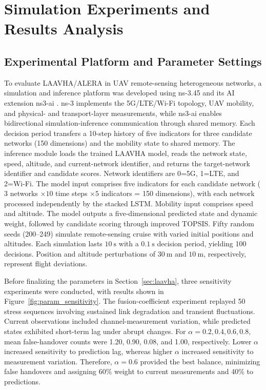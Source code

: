 \documentclass[remotesensing,article,submit,moreauthors]{Definitions/mdpi}
\begin{document}
\section{Simulation Experiments and Results Analysis}\label{sec:sim}

\subsection{Experimental Platform and Parameter Settings}\label{sec:platform}

To evaluate LAAVHA/ALERA in UAV remote-sensing heterogeneous networks, a simulation and inference platform was developed using ns-3.45 \citep{ref32} and its AI extension ns3-ai \citep{ref33}. ns-3 implements the 5G/LTE/Wi-Fi topology, UAV mobility, and physical- and transport-layer measurements, while ns3-ai enables bidirectional simulation-inference communication through shared memory. Each decision period transfers a 10-step history of five indicators for three candidate networks (150 dimensions) and the mobility state to shared memory. The inference module loads the trained LAAVHA model, reads the network state, speed, altitude, and current-network identifier, and returns the target-network identifier and candidate scores. Network identifiers are 0=5G, 1=LTE, and 2=Wi-Fi. The model input comprises five indicators for each candidate network ($3$ networks $\times10$ time steps $\times5$ indicators = 150 dimensions), with each network processed independently by the stacked LSTM. Mobility input comprises speed and altitude. The model outputs a five-dimensional predicted state and dynamic weight, followed by candidate scoring through improved TOPSIS. Fifty random seeds (200--249) simulate remote-sensing cruise with varied initial positions and altitudes. Each simulation lasts $10~\mathrm{s}$ with a $0.1~\mathrm{s}$ decision period, yielding 100 decisions. Position and altitude perturbations of $30~\mathrm{m}$ and $10~\mathrm{m}$, respectively, represent flight deviations.

Before finalizing the parameters in Section~\ref{sec:laavha}, three sensitivity experiments were conducted, with results shown in Figure~\ref{fig:param_sensitivity}. The fusion-coefficient experiment replayed 50 stress sequences involving sustained link degradation and transient fluctuations. Current observations included channel-measurement variation, while predicted states exhibited short-term lag under abrupt changes. For $\alpha=0.2,0.4,0.6,0.8$, mean false-handover counts were 1.20, 0.90, 0.08, and 1.00, respectively. Lower $\alpha$ increased sensitivity to prediction lag, whereas higher $\alpha$ increased sensitivity to measurement variation. Therefore, $\alpha=0.6$ provided the best balance, minimizing false handovers and assigning 60\% weight to current measurements and 40\% to predictions.
\end{document}

